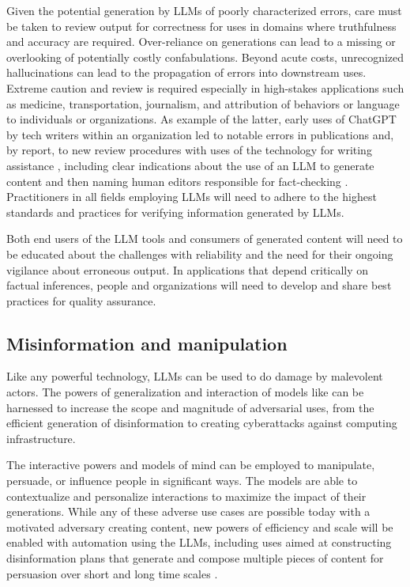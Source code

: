 Given the potential generation by LLMs of poorly characterized errors, care must be taken to review output for correctness for uses in domains where truthfulness and accuracy are required.  Over-reliance on generations can lead to a missing or overlooking of potentially costly confabulations. Beyond acute costs, unrecognized hallucinations can lead to the propagation of errors into downstream uses.  Extreme caution and review is required especially in high-stakes applications such as medicine, transportation, journalism, and attribution of behaviors or language to individuals or organizations.  As example of the latter, early uses of ChatGPT by tech writers within an organization led to notable errors in publications and, by report, to new review procedures with uses of the technology for writing assistance \cite{CNETpause2023}, including clear indications about the use of an LLM to generate content and then naming human editors responsible for fact-checking \cite{CNETdirectorstatement2023}. Practitioners in all fields employing LLMs will need to adhere to the highest standards and practices for verifying information generated by LLMs.  

Both end users of the LLM tools and consumers of generated content will need to be educated about the challenges with reliability and the need for their ongoing vigilance about erroneous output. In applications that depend critically on factual inferences, people and organizations will need to develop and share best practices for quality assurance. 
 
\subsection{Misinformation and manipulation} 

Like any powerful technology, LLMs can be used to do damage by malevolent actors. The powers of generalization and interaction of models like {\DV} can be harnessed to increase the scope and magnitude of adversarial uses, from the efficient generation of disinformation to creating \hbox{cyberattacks} against computing infrastructure. 

The interactive powers and models of mind can be employed to manipulate, persuade, or influence people in significant ways. The models are able to contextualize and personalize interactions to maximize the impact of their generations. While any of these adverse use cases are possible today with a motivated adversary creating content, new powers of efficiency and scale will be enabled with automation using the LLMs, including uses aimed at constructing disinformation plans that generate and compose multiple pieces of content for persuasion over short and long time scales \cite{disinfoICMI2022}.  

